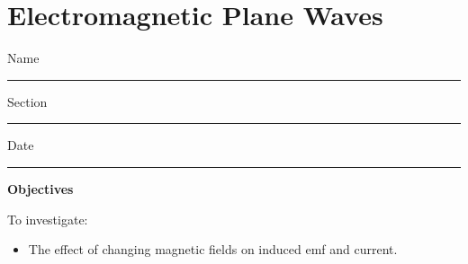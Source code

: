 \setcounter{equation}{0}
\setcounter{figure}{0}

\section{Electromagnetic Plane Waves}

Name \rule{2.0in}{0.1pt}\hfill{}Section \rule{1.0in}{0.1pt}\hfill{}Date
\rule{1.0in}{0.1pt}

\textbf{Objectives}

To investigate:

\begin{itemize}
\item The effect of changing magnetic fields on induced emf and current.
\end{itemize}


